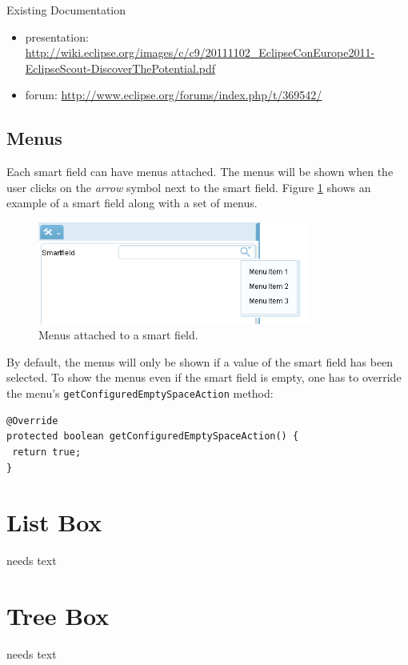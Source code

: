 \documentclass[a4paper,10pt,twoside]{book}
\begin{document}
\noindent Existing Documentation
\begin{itemize}
  \item presentation: \url{http://wiki.eclipse.org/images/c/c9/20111102_EclipseConEurope2011-EclipseScout-DiscoverThePotential.pdf}
  \item forum: \url{http://www.eclipse.org/forums/index.php/t/369542/}
\end{itemize}

\subsection{Menus}
Each smart field can have menus attached. The menus will be shown when the user clicks on the \emph{arrow} symbol next to the smart field. Figure \ref{fig:smartfield_menu} shows an example of a smart field along with a set of menus.
\begin{figure}[!htb]
\centering
\includegraphics[width=0.8\textwidth]{smartfieldmenu.png}
\caption{Menus attached to a smart field.}
\label{fig:smartfield_menu}
\end{figure}

By default, the menus will only be shown if a value of the smart field has been selected. To show the menus even if the smart field is empty, one has to override the menu's \lstinline$getConfiguredEmptySpaceAction$ method:

\begin{lstlisting}[backgroundcolor=\color{white}]
@Override
protected boolean getConfiguredEmptySpaceAction() {
 return true;
}
\end{lstlisting}

\section{List Box}
needs text

\section{Tree Box}
needs text
\end{document}
